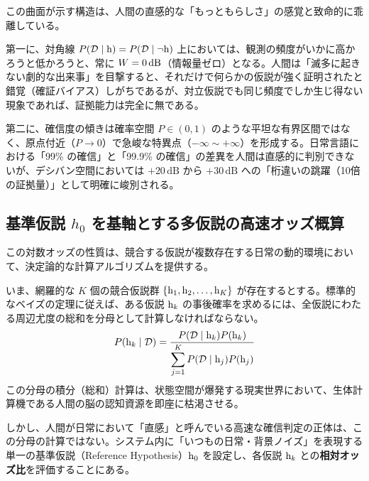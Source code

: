    この曲面が示す構造は、人間の直感的な「もっともらしさ」の感覚と致命的に乖離している。

    第一に、対角線 $P(\mathcal{D} \mid \mathrm{h}) = P(\mathcal{D} \mid \neg \mathrm{h})$ 上においては、観測の頻度がいかに高かろうと低かろうと、常に $W = 0\,\text{dB}$（情報量ゼロ）となる。人間は「滅多に起きない劇的な出来事」を目撃すると、それだけで何らかの仮説が強く証明されたと錯覚（確証バイアス）しがちであるが、対立仮説でも同じ頻度でしか生じ得ない現象であれば、証拠能力は完全に無である。

    第二に、確信度の傾きは確率空間 $P \in (0, 1)$ のような平坦な有界区間ではなく、原点付近（$P \to 0$）で急峻な特異点（$-\infty \sim +\infty$）を形成する。日常言語における「99\% の確信」と「99.9\% の確信」の差異を人間は直感的に判別できないが、デシバン空間においては $+20\,\text{dB}$ から $+30\,\text{dB}$ への「桁違いの跳躍（10倍の証拠量）」として明確に峻別される。

    \subsection{基準仮説 $h_0$ を基軸とする多仮説の高速オッズ概算}

    この対数オッズの性質は、競合する仮説が複数存在する日常の動的環境において、決定論的な計算アルゴリズムを提供する。

    いま、網羅的な $K$ 個の競合仮説群 $\{\mathrm{h}_1, \mathrm{h}_2, \dots, \mathrm{h}_K\}$ が存在するとする。標準的なベイズの定理に従えば、ある仮説 $\mathrm{h}_k$ の事後確率を求めるには、全仮説にわたる周辺尤度の総和を分母として計算しなければならない。
    \begin{equation}
        P(\mathrm{h}_k \mid \mathcal{D}) = \frac{P(\mathcal{D} \mid \mathrm{h}_k) P(\mathrm{h}_k)}{\displaystyle\sum_{j=1}^K P(\mathcal{D} \mid \mathrm{h}_j) P(\mathrm{h}_j)}
    \end{equation}
    この分母の積分（総和）計算は、状態空間が爆発する現実世界において、生体計算機である人間の脳の認知資源を即座に枯渇させる。

    しかし、人間が日常において「直感」と呼んでいる高速な確信判定の正体は、この分母の計算ではない。システム内に「いつもの日常・背景ノイズ」を表現する単一の基準仮説（Reference Hypothesis）$\mathrm{h}_0$ を設定し、各仮説 $\mathrm{h}_k$ との\textbf{相対オッズ比}を評価することにある。

